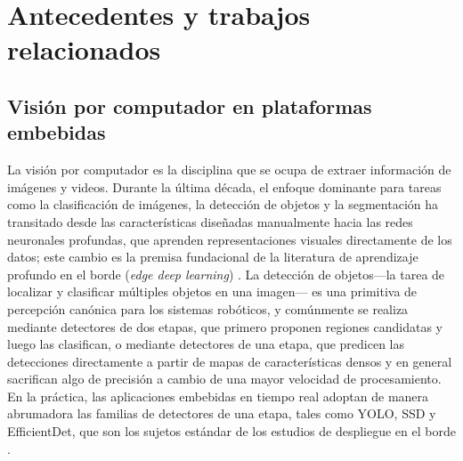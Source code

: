 %

\chapter{Antecedentes y trabajos relacionados}
\label{chap:background}

\section{Visión por computador en plataformas embebidas}
\label{sec:cv-embedded}

La visión por computador es la disciplina que se ocupa de extraer información
de imágenes y videos. Durante la última década, el enfoque dominante para
tareas como la clasificación de imágenes, la detección de objetos y la
segmentación ha transitado desde las características diseñadas manualmente
hacia las redes neuronales profundas, que aprenden representaciones visuales
directamente de los datos; este cambio es la premisa fundacional de la
literatura de aprendizaje profundo en el borde (\emph{edge deep learning})
\cite{xu2025}. La detección de objetos---la tarea de localizar y clasificar
múltiples objetos en una imagen--- es una primitiva de percepción canónica
para los sistemas robóticos, y comúnmente se realiza mediante detectores de
dos etapas, que primero proponen regiones candidatas y luego las clasifican,
o mediante detectores de una etapa, que predicen las detecciones directamente
a partir de mapas de características densos y en general sacrifican algo de
precisión a cambio de una mayor velocidad de procesamiento.
En la práctica, las aplicaciones embebidas en tiempo real adoptan de manera
abrumadora las familias de detectores de una etapa, tales como YOLO, SSD y
EfficientDet, que son los sujetos estándar de los estudios de despliegue en
el borde \cite{alqahtani2026, szegedi2026, tang2026}.

